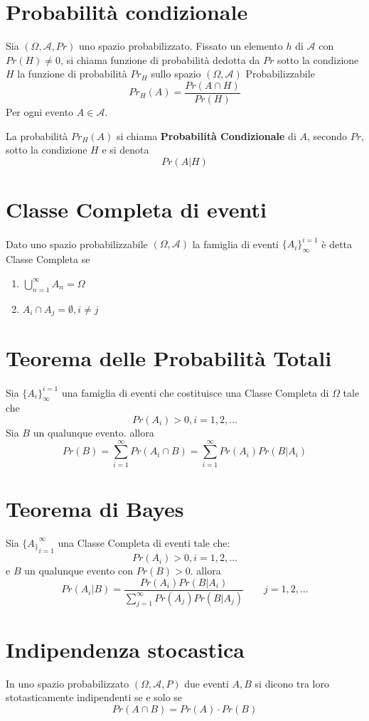 \documentclass[a4paper]{report}
\begin{document}
  \section{Probabilità condizionale}
  Sia $(\Omega, \mathcal{A}, Pr)$ uno spazio probabilizzato. Fissato un elemento $h$ di $\mathcal{A}$ con $Pr(H) \neq 0$, si chiama funzione di probabilità dedotta da $Pr$ sotto la condizione $H$ la funzione di probabilità $Pr_H$ sullo spazio $(\Omega, \mathcal{A})$ Probabilizzabile
  \[ Pr_H(A) = \frac{Pr(A \cap H)}{Pr(H)} \]
  Per ogni evento $A \in \mathcal{A}$.

  La probabilità $Pr_H(A)$ si chiama \textbf{Probabilità Condizionale} di $A$, secondo $Pr$, sotto la condizione $H$ e si denota
  \[ Pr(A|H) \]

  \section{Classe Completa di eventi}
  Dato uno spazio probabilizzabile $(\Omega, \mathcal{A})$ la famiglia di eventi ${\{A_i\}_\infty^{i=1}}$ è detta Classe Completa se
  \begin{enumerate}
    \item $\bigcup\limits_{n=1}^{\infty} A_n = \Omega$
    \item $A_i \cap A_j = \emptyset,  i \neq j$
  \end{enumerate}

  \section{Teorema delle Probabilità Totali}
  Sia ${\{A_i\}_\infty^{i=1}}$ una famiglia di eventi che costituisce una Classe Completa di $\Omega$ tale che
  \[ Pr(A_i) > 0, i = 1,2,... \]
  Sia $B$ un qualunque evento. allora
  \[ Pr(B) = \sum_{i=1}^\infty Pr(A_i \cap B) = \sum_{i=1}^\infty Pr(A_i)Pr(B|A_i) \]

  \section{Teorema di Bayes}
  Sia ${\{A_\}}_{i=1}^\infty$ una Classe Completa di eventi tale che:\\
  $$Pr(A_i) > 0, i = 1,2,...$$
  e $B$ un qualunque evento con $Pr(B)>0$. allora
  $$Pr(A_i|B)=\frac{Pr(A_i)Pr(B|A_i)}{\sum_{j=1}^\infty Pr(A_j)Pr(B|A_j)} \qquad j=1,2,...  $$

  \section{Indipendenza stocastica}
  In uno spazio probabilizzato $(\Omega, \mathcal{A}, P)$ due eventi $A,B$ si dicono tra loro stotasticamente indipendenti se e solo se
  $$Pr(A \cap B) = Pr(A) \cdot Pr(B)$$
\end{document}
